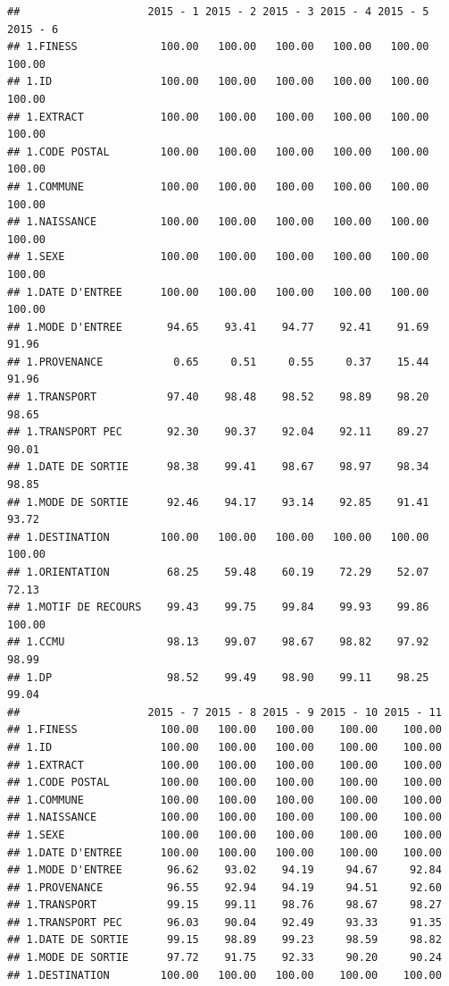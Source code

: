 \documentclass[]{article}
\begin{document}
\begin{verbatim}
##                    2015 - 1 2015 - 2 2015 - 3 2015 - 4 2015 - 5 2015 - 6
## 1.FINESS             100.00   100.00   100.00   100.00   100.00   100.00
## 1.ID                 100.00   100.00   100.00   100.00   100.00   100.00
## 1.EXTRACT            100.00   100.00   100.00   100.00   100.00   100.00
## 1.CODE POSTAL        100.00   100.00   100.00   100.00   100.00   100.00
## 1.COMMUNE            100.00   100.00   100.00   100.00   100.00   100.00
## 1.NAISSANCE          100.00   100.00   100.00   100.00   100.00   100.00
## 1.SEXE               100.00   100.00   100.00   100.00   100.00   100.00
## 1.DATE D'ENTREE      100.00   100.00   100.00   100.00   100.00   100.00
## 1.MODE D'ENTREE       94.65    93.41    94.77    92.41    91.69    91.96
## 1.PROVENANCE           0.65     0.51     0.55     0.37    15.44    91.96
## 1.TRANSPORT           97.40    98.48    98.52    98.89    98.20    98.65
## 1.TRANSPORT PEC       92.30    90.37    92.04    92.11    89.27    90.01
## 1.DATE DE SORTIE      98.38    99.41    98.67    98.97    98.34    98.85
## 1.MODE DE SORTIE      92.46    94.17    93.14    92.85    91.41    93.72
## 1.DESTINATION        100.00   100.00   100.00   100.00   100.00   100.00
## 1.ORIENTATION         68.25    59.48    60.19    72.29    52.07    72.13
## 1.MOTIF DE RECOURS    99.43    99.75    99.84    99.93    99.86   100.00
## 1.CCMU                98.13    99.07    98.67    98.82    97.92    98.99
## 1.DP                  98.52    99.49    98.90    99.11    98.25    99.04
##                    2015 - 7 2015 - 8 2015 - 9 2015 - 10 2015 - 11
## 1.FINESS             100.00   100.00   100.00    100.00    100.00
## 1.ID                 100.00   100.00   100.00    100.00    100.00
## 1.EXTRACT            100.00   100.00   100.00    100.00    100.00
## 1.CODE POSTAL        100.00   100.00   100.00    100.00    100.00
## 1.COMMUNE            100.00   100.00   100.00    100.00    100.00
## 1.NAISSANCE          100.00   100.00   100.00    100.00    100.00
## 1.SEXE               100.00   100.00   100.00    100.00    100.00
## 1.DATE D'ENTREE      100.00   100.00   100.00    100.00    100.00
## 1.MODE D'ENTREE       96.62    93.02    94.19     94.67     92.84
## 1.PROVENANCE          96.55    92.94    94.19     94.51     92.60
## 1.TRANSPORT           99.15    99.11    98.76     98.67     98.27
## 1.TRANSPORT PEC       96.03    90.04    92.49     93.33     91.35
## 1.DATE DE SORTIE      99.15    98.89    99.23     98.59     98.82
## 1.MODE DE SORTIE      97.72    91.75    92.33     90.20     90.24
## 1.DESTINATION        100.00   100.00   100.00    100.00    100.00

\end{verbatim}
\end{document}
